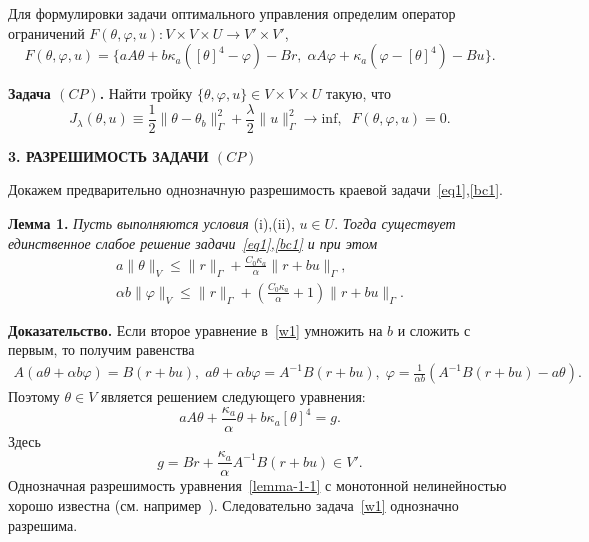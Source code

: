 \documentclass[12pt]{article}
\begin{document}
    Для формулировки задачи оптимального управления определим оператор
    ограничений $F(\theta, \varphi, u) : V \times V \times U \rightarrow V' \times V'$,
    \[
        F(\theta, \varphi, u) = \{ aA\theta + b \kappa_a ( [\theta]^4- \varphi) - Br,\;
        \alpha A \varphi + \kappa_a (\varphi -[\theta]^4) - Bu\}.
    \]


    \textbf{Задача $(CP)$.} Найти тройку $\{\theta, \varphi, u \} \in V \times V \times U$
    такую, что
    \begin{equation}
        \label{CP}
        J_\lambda(\theta, u) \equiv \frac{1}{2}\|\theta -\theta_b\|^2_\Gamma
        + \frac{\lambda}{2}\|u\|^2_\Gamma \rightarrow \text{inf},\;\; F(\theta, \varphi, u)=0.
    \end{equation}





    \begin{center}
        \textbf{3. РАЗРЕШИМОСТЬ ЗАДАЧИ $(CP)$}
    \end{center}

    Докажем предварительно однозначную разрешимость краевой задачи~\eqref{eq1},\eqref{bc1}.

    \textbf{Лемма 1.}
    {\it
        Пусть выполняются условия} (i),(ii), $u\in U$. {\it Тогда
    существует единственное слабое решение задачи~\eqref{eq1},\eqref{bc1} и при этом}
    \begin{equation}
        \label{E1}
        \begin{aligned}
            a\|\theta\|_V \leq \|r\|_\Gamma + \frac{C_0\kappa_a}{\alpha}\|r+bu\|_\Gamma, \\
            \alpha b \|\varphi\|_V \leq \|r\|_\Gamma +
            \left(\frac{C_0\kappa_a}{\alpha} + 1\right)\|r+bu\|_\Gamma.
        \end{aligned}
    \end{equation}

    {\bf Доказательство.}
    Если второе уравнение в~\eqref{w1} умножить на $b$ и сложить с первым, то получим равенства
    \begin{gather*}
        A \left( a \theta + \alpha b \varphi \right) = B(r + bu),\;
        a\theta + \alpha b \varphi = A^{-1}B(r + bu),\;
        \varphi = \frac{1}{\alpha b}(A^{-1}B(r +bu) - a\theta).
    \end{gather*}
    Поэтому $\theta \in V$ является решением следующего уравнения:
    \begin{equation}
        \label{lemma-1-1}
        a A \theta + \frac{\kappa_a}{\alpha} \theta + b\kappa_a [\theta]^4 = g.
    \end{equation}
    Здесь \[ g = Br + \frac{\kappa_a}{\alpha}A^{-1}B(r+bu) \in V'. \]
    Однозначная разрешимость уравнения~\eqref{lemma-1-1} с монотонной нелинейностью
    хорошо известна (см.
    например~\cite{Kufner}).
    Следовательно задача~\eqref{w1} однозначно разрешима.
\end{document}

